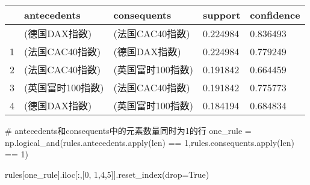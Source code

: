 \documentclass[
  letterpaper,
  DIV=11,
  numbers=noendperiod]{scrreprt}
\newenvironment{Shaded}{\begin{snugshade}}{\end{snugshade}}
\newcommand{\BuiltInTok}[1]{\textcolor[rgb]{0.00,0.23,0.31}{#1}}
\newcommand{\CommentTok}[1]{\textcolor[rgb]{0.37,0.37,0.37}{#1}}
\newcommand{\DecValTok}[1]{\textcolor[rgb]{0.68,0.00,0.00}{#1}}
\newcommand{\NormalTok}[1]{\textcolor[rgb]{0.00,0.23,0.31}{#1}}
\newcommand{\OperatorTok}[1]{\textcolor[rgb]{0.37,0.37,0.37}{#1}}
\newcommand{\VariableTok}[1]{\textcolor[rgb]{0.07,0.07,0.07}{#1}}
\begin{document}
\begin{longtable}[]{@{}lllll@{}}
\toprule\noalign{}
& antecedents & consequents & support & confidence \\
\midrule\noalign{}
\endhead
\bottomrule\noalign{}
\endlastfoot
0 & (德国DAX指数) & (法国CAC40指数) & 0.224984 & 0.836493 \\
1 & (法国CAC40指数) & (德国DAX指数) & 0.224984 & 0.779249 \\
2 & (法国CAC40指数) & (英国富时100指数) & 0.191842 & 0.664459 \\
3 & (英国富时100指数) & (法国CAC40指数) & 0.191842 & 0.775773 \\
4 & (德国DAX指数) & (英国富时100指数) & 0.184194 & 0.684834 \\
\end{longtable}

\begin{Shaded}
\begin{Highlighting}[]
\CommentTok{\# antecedents和consequents中的元素数量同时为1的行}
\NormalTok{one\_rule }\OperatorTok{=}\NormalTok{ np.logical\_and(rules.antecedents.}\BuiltInTok{apply}\NormalTok{(}\BuiltInTok{len}\NormalTok{) }\OperatorTok{==} \DecValTok{1}\NormalTok{,rules.consequents.}\BuiltInTok{apply}\NormalTok{(}\BuiltInTok{len}\NormalTok{) }\OperatorTok{==} \DecValTok{1}\NormalTok{)}
\end{Highlighting}
\end{Shaded}

\begin{Shaded}
\begin{Highlighting}[]
\NormalTok{rules[one\_rule].iloc[:,[}\DecValTok{0}\NormalTok{, }\DecValTok{1}\NormalTok{,}\DecValTok{4}\NormalTok{,}\DecValTok{5}\NormalTok{]].reset\_index(drop}\OperatorTok{=}\VariableTok{True}\NormalTok{)}
\end{Highlighting}
\end{Shaded}
\end{document}
